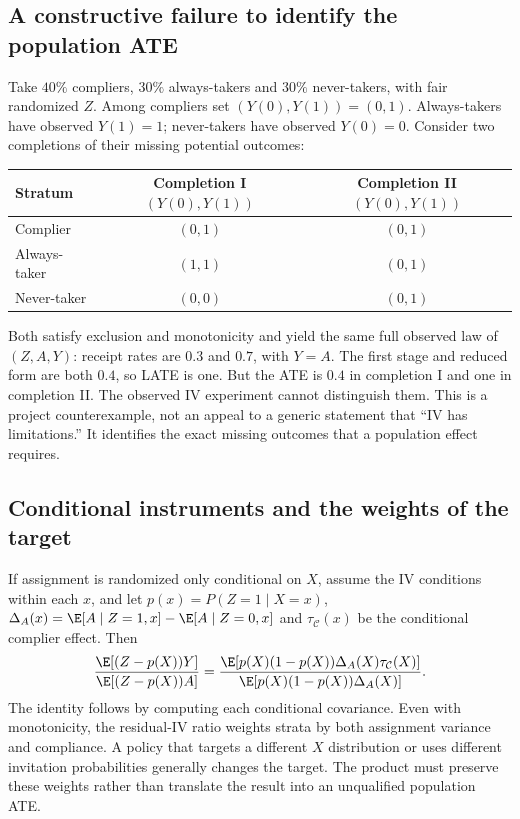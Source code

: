\subsection{A constructive failure to identify the population ATE}
Take $40\%$ compliers, $30\%$ always-takers and $30\%$ never-takers,
with fair randomized $Z$. Among compliers set $(Y(0),Y(1))=(0,1)$.
Always-takers have observed $Y(1)=1$; never-takers have observed $Y(0)=0$.
Consider two completions of their missing potential outcomes:
\begin{center}
\begin{tabular}{lcc}
\toprule
Stratum & Completion I $(Y(0),Y(1))$ & Completion II $(Y(0),Y(1))$\\
\midrule
Complier & $(0,1)$ & $(0,1)$\\
Always-taker & $(1,1)$ & $(0,1)$\\
Never-taker & $(0,0)$ & $(0,1)$\\
\bottomrule
\end{tabular}
\end{center}
Both satisfy exclusion and monotonicity and yield the same full observed
law of $(Z,A,Y)$: receipt rates are $0.3$ and $0.7$, with $Y=A$.
The first stage and reduced form are both $0.4$, so LATE is one. But
the ATE is $0.4$ in completion I and one in completion II. The observed
IV experiment cannot distinguish them. This is a project counterexample,
not an appeal to a generic statement that ``IV has limitations.'' It
identifies the exact missing outcomes that a population effect requires.

\subsection{Conditional instruments and the weights of the target}
If assignment is randomized only conditional on $X$, assume the IV
conditions within each $x$, and let $p(x)=P(Z=1\mid X=x)$,
$\Delta_A(x)=\E[A\mid Z=1,x]-\E[A\mid Z=0,x]$ and
$\tau_{\mathcal C}(x)$ be the conditional complier effect. Then
\[
 \frac{\E[(Z-p(X))Y]}{\E[(Z-p(X))A]}
 =\frac{\E[p(X)(1-p(X))\Delta_A(X)\tau_{\mathcal C}(X)]}
        {\E[p(X)(1-p(X))\Delta_A(X)]}.
\]
The identity follows by computing each conditional covariance. Even with
monotonicity, the residual-IV ratio weights strata by both assignment
variance and compliance. A policy that targets a different $X$ distribution
or uses different invitation probabilities generally changes the target.
The product must preserve these weights rather than translate the result
into an unqualified population ATE.

